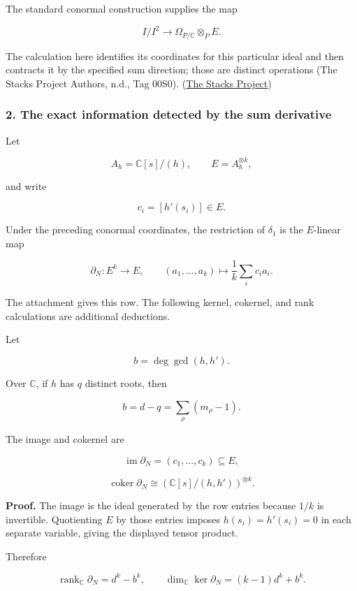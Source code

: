 The standard conormal construction supplies the map

\[
I/I^2\longrightarrow\Omega_{P/\mathbb C}\otimes_PE.
\]

The calculation here identifies its coordinates for this particular ideal and then contracts it by
the specified sum direction; those are distinct operations (The Stacks Project Authors, n.d., Tag
00S0). (\href{https://stacks.math.columbia.edu/tag/00S0}{The Stacks Project})

\subsubsection{2. The exact information detected by the sum
derivative}\label{conormal_tower_pasted:the-exact-information-detected-by-the-sum-derivative}

Let

\[
A_h=\mathbb C[s]/(h),\qquad E=A_h^{\otimes k},
\]

and write

\[
c_i=[h'(s_i)]\in E.
\]

Under the preceding conormal coordinates, the restriction of \(\delta_1\) is the \(E\)-linear map

\[
\boxed{
\partial_N:E^k\longrightarrow E,
\qquad
(a_1,\ldots,a_k)\longmapsto\frac1k\sum_i c_i a_i.
}
\]

The attachment gives this row. The following kernel, cokernel, and rank calculations are additional
deductions.

Let

\[
b=\deg\gcd(h,h').
\]

Over \(\mathbb C\), if \(h\) has \(q\) distinct roots, then

\[
b=d-q=\sum_\rho(m_\rho-1).
\]

The image and cokernel are

\[
\boxed{
\operatorname{im}\partial_N=(c_1,\ldots,c_k)\subseteq E,
}
\]

\[
\boxed{
\operatorname{coker}\partial_N
\cong
\left(\mathbb C[s]/(h,h')\right)^{\otimes k}.
}
\]

\textbf{Proof.} The image is the ideal generated by the row entries because \(1/k\) is invertible.
Quotienting \(E\) by those entries imposes \(h(s_i)=h'(s_i)=0\) in each separate variable, giving
the displayed tensor product.

Therefore

\[
\boxed{
\operatorname{rank}_{\mathbb C}\partial_N=d^k-b^k,
\qquad
\dim_{\mathbb C}\ker\partial_N=(k-1)d^k+b^k.
}
\]

